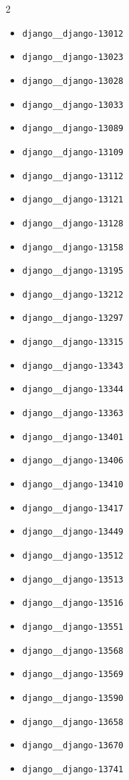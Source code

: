 \documentclass{article} %
\begin{document}
\begin{multicols}{2}
\begin{itemize}
    \item \texttt{django\_\_django-13012}
    \item \texttt{django\_\_django-13023}
    \item \texttt{django\_\_django-13028}
    \item \texttt{django\_\_django-13033}
    \item \texttt{django\_\_django-13089}
    \item \texttt{django\_\_django-13109}
    \item \texttt{django\_\_django-13112}
    \item \texttt{django\_\_django-13121}
    \item \texttt{django\_\_django-13128}
    \item \texttt{django\_\_django-13158}
    \item \texttt{django\_\_django-13195}
    \item \texttt{django\_\_django-13212}
    \item \texttt{django\_\_django-13297}
    \item \texttt{django\_\_django-13315}
    \item \texttt{django\_\_django-13343}
    \item \texttt{django\_\_django-13344}
    \item \texttt{django\_\_django-13363}
    \item \texttt{django\_\_django-13401}
    \item \texttt{django\_\_django-13406}
    \item \texttt{django\_\_django-13410}
    \item \texttt{django\_\_django-13417}
    \item \texttt{django\_\_django-13449}
    \item \texttt{django\_\_django-13512}
    \item \texttt{django\_\_django-13513}
    \item \texttt{django\_\_django-13516}
    \item \texttt{django\_\_django-13551}
    \item \texttt{django\_\_django-13568}
    \item \texttt{django\_\_django-13569}
    \item \texttt{django\_\_django-13590}
    \item \texttt{django\_\_django-13658}
    \item \texttt{django\_\_django-13670}
    \item \texttt{django\_\_django-13741}

\end{itemize}
\end{multicols}
\end{document}
